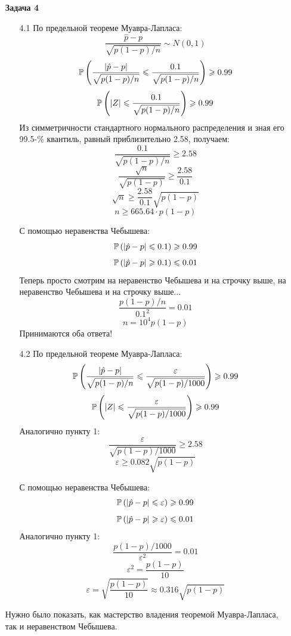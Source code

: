 \documentclass[12pt, a4paper]{article}\usepackage[]{graphicx}\usepackage[]{color}
\begin{document}
\begin{enumerate}
					\item[\textbf{Задача 4}]

					\begin{enumerate}
						\item[4.1] По предельной теореме Муавра-Лапласа:
						\[ \dfrac{\hat{p} - p}{\sqrt{p(1-p)/n}} \sim N (0,1) \]
						\[ \P \left( \dfrac{|\hat{p} - p|}{\sqrt{p(1-p)/n}} \leqslant \dfrac{0.1}{\sqrt{p(1-p)/n}} \right) \geqslant 0.99 \]
						\[ \P \left( |Z| \leqslant \dfrac{0.1}{\sqrt{p(1-p)/n}} \right) \geqslant 0.99 \]
						Из симметричности стандартного нормального распределения и зная его 99.5-\% квантиль, равный приблизительно 2.58, получаем:
						\[ \dfrac{0.1}{\sqrt{p(1-p)/n}} \geqslant 2.58 \]
						\[ \dfrac{\sqrt{n}}{\sqrt{p(1-p)}} \geqslant \dfrac{2.58}{0.1} \]
						\[ \sqrt{n} \geqslant \dfrac{2.58}{0.1} \sqrt{p(1-p)} \]
						\[ n \geqslant 665.64 \cdot p(1-p) \]

						С помощью неравенства Чебышева:
						\[ \P \left( |\hat{p} - p| \leqslant 0.1 \right) \geqslant 0.99 \]
						\[ \P \left( |\hat{p} - p| \geqslant 0.1 \right) \leqslant 0.01 \]
						Теперь просто смотрим на неравенство Чебышева и на строчку выше, на неравенство Чебышева и на строчку выше...
						\[ \dfrac{p(1-p)/n}{0.1^2} = 0.01\]
						\[ n = 10^4 p(1-p) \]
						Принимаются оба ответа!

						\item[4.2] По предельной теореме Муавра-Лапласа:
						\[ \P \left( \dfrac{|\hat{p} - p|}{\sqrt{p(1-p)/n}} \leqslant \dfrac{\varepsilon}{\sqrt{p(1-p)/1000}} \right) \geqslant 0.99 \]
						\[ \P \left( |Z| \leqslant \dfrac{\varepsilon}{\sqrt{p(1-p)/1000}} \right) \geqslant 0.99 \]
						Аналогично пункту 1:
						\[ \dfrac{\varepsilon}{\sqrt{p(1-p)/1000}} \geqslant 2.58 \]
						\[ \varepsilon \geqslant 0.082 \sqrt{p(1-p)} \]

						С помощью неравенства Чебышева:
						\[ \P \left( |\hat{p} - p| \leqslant \varepsilon \right) \geqslant 0.99 \]
						\[ \P \left( |\hat{p} - p| \geqslant \varepsilon \right) \leqslant 0.01 \]
						Аналогично пункту 1:
						\[ \dfrac{p(1-p)/1000}{\varepsilon^2} = 0.01\]
						\[ \varepsilon^2 = \dfrac{p(1-p)}{10} \]
						\[ \varepsilon = \sqrt{\dfrac{p(1-p)}{10}} \approx 0.316 \sqrt{p(1-p)} \]

					\end{enumerate}

					Нужно было показать, как мастерство владения теоремой Муавра-Лапласа, так и неравенством Чебышева.


				\end{enumerate}
\end{document}

